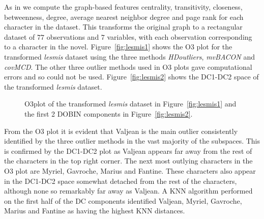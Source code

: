\documentclass[letter,12pt]{article}
\begin{document}
As in \cite{wilkinson2017visualizing} we compute the graph-based features centrality, transitivity, closeness, betweenness, degree, average nearest neighbor degree and page rank for each character in the dataset. This transforms the original graph to a rectangular dataset of $77$ observations and $7$ variables, with each observation corresponding to a character in the novel. Figure~\ref{fig:lesmis1} shows the O3 plot for the transformed \textit{lesmis} dataset using the three methods \textit{HDoutliers}, \textit{mvBACON} and \textit{covMCD}. The other three outlier methods used in O3 plots gave computational errors and so could not be used. Figure~\ref{fig:lesmis2} shows the DC1-DC2 space of the transformed \textit{lesmis} dataset.

\begin{figure}[!ht]
	\centering
	\hfill
	\caption{O3plot of the transformed \textit{lesmis} dataset in Figure~\ref{fig:lesmis1} and the first 2 DOBIN components in Figure~\ref{fig:lesmis2}.}
	\label{fig:lesmis}
\end{figure}

From the O3 plot it is evident that Valjean is the main outlier consistently identified by the three outlier methods in the vast majority of the subspaces. This is confirmed by the DC1-DC2 plot as Valjean appears far away from the rest of the characters in the top right corner. The next most outlying characters in the O3 plot are Myriel, Gavroche, Marius and Fantine. These characters also appear in the DC1-DC2 space somewhat detached from the rest of the characters, although none so remarkably far away as Valjean. A KNN algorithm performed on the first half of the DC components identified Valjean, Myriel, Gavroche, Marius and Fantine as having the highest KNN distances.
\end{document}
